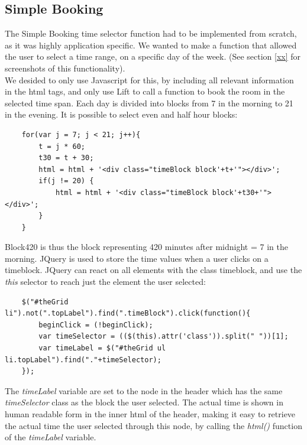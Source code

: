 \subsection{Simple Booking}
The Simple Booking time selector function had to be implemented from scratch, as it was highly application specific. We wanted to make a function that allowed the user to select a time range, on a specific day of the week. (See section \ref{xx} for screenshots of this functionality). \\
We desided to only use Javascript for this, by including all relevant information in the html tags, and only use Lift to call a function to book the room in the selected time span. Each day is divided into blocks from 7 in the morning to 21 in the evening. It is possible to select even and half hour blocks:

\begin{verbatim}
    for(var j = 7; j < 21; j++){
        t = j * 60;
        t30 = t + 30;
        html = html + '<div class="timeBlock block'+t+'"></div>';
        if(j != 20) {
            html = html + '<div class="timeBlock block'+t30+'"></div>';	
        }
    }
\end{verbatim}

Block420 is thus the block representing 420 minutes after midnight = 7 in the morning. JQuery is used to store the time values when a user clicks on a timeblock. JQuery can react on all elements with the class timeblock, and use the \emph{this} selector to reach just the element the user selected:

\begin{verbatim}
    $("#theGrid li").not(".topLabel").find(".timeBlock").click(function(){
        beginClick = (!beginClick);
        var timeSelector = (($(this).attr('class')).split(" "))[1];
        var timeLabel = $("#theGrid ul li.topLabel").find("."+timeSelector);
    });
\end{verbatim}

The \emph{timeLabel} variable are set to the node in the header which has the same \emph{timeSelector} class as the block the user selected. The actual time is shown in human readable form in the inner html of the header, making it easy to retrieve the actual time the user selected through this node, by calling the \emph{html()} function of the \emph{timeLabel} variable.